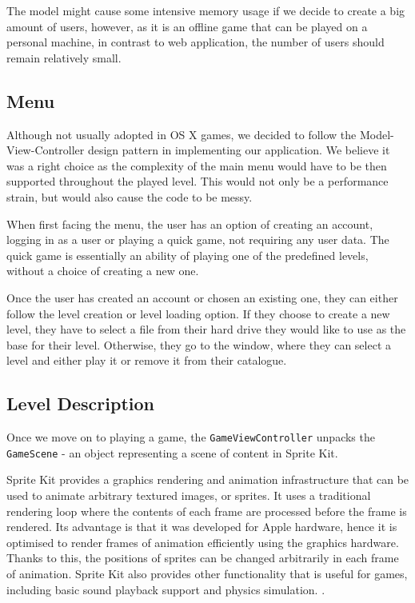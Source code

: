 The model might cause some intensive memory usage if we decide to create a big amount of users, however, as it is an offline game that can be played on a personal machine, in contrast to web application, the number of users should remain relatively small.

\vspace{10pt}

\subsection{Menu}

Although not usually adopted in OS X games, we decided to follow the Model-View-Controller design pattern in implementing our application. We believe it was a right choice as the complexity of the main menu would have to be then supported throughout the played level. This would not only be a performance strain, but would also cause the code to be messy.

When first facing the menu, the user has an option of creating an account, logging in as a user or playing a quick game, not requiring any user data. 
The quick game is essentially an ability of playing one of the predefined levels, without a choice of creating a new one.

Once the user has created an account or chosen an existing one, they can either follow the level creation or level loading option. If they choose to create a new level, they have to select a file from their hard drive they would like to use as the base for their level. Otherwise, they go to the window, where they can select a level and either play it or remove it from their catalogue.

\vspace{10pt}

\subsection{Level Description}

Once we move on to playing a game, the \verb|GameViewController| unpacks the \verb|GameScene| - an object representing a scene of content in Sprite Kit.

Sprite Kit provides a graphics rendering and animation infrastructure that can be used to animate arbitrary textured images, or sprites. It uses a traditional rendering loop where the contents of each frame are processed before the frame is rendered. Its advantage is that it was developed for Apple hardware, hence it is optimised to render frames of animation efficiently using the graphics hardware. Thanks to this, the positions of sprites can be changed arbitrarily in each frame of animation. Sprite Kit also provides other functionality that is useful for games, including basic sound playback support and physics simulation. \cite{spritekit}. 

